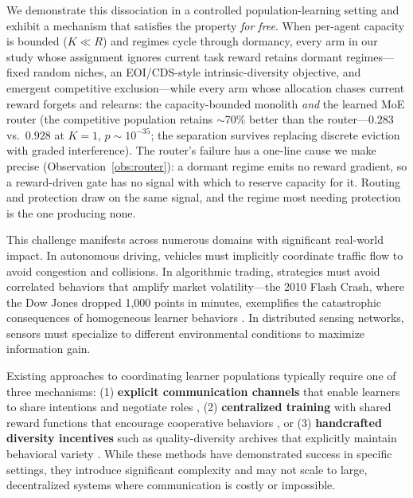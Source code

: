 \documentclass{article}
\begin{document}
We demonstrate this dissociation in a controlled population-learning setting and exhibit a mechanism that satisfies the property \emph{for free}. When per-agent capacity is bounded ($K \ll R$) and regimes cycle through dormancy, every arm in our study whose assignment ignores current task reward retains dormant regimes---fixed random niches, an EOI/CDS-style intrinsic-diversity objective, and emergent competitive exclusion---while every arm whose allocation chases current reward forgets and relearns: the capacity-bounded monolith \emph{and} the learned MoE router (the competitive population retains $\sim$70\% better than the router---$0.283$ vs.\ $0.928$ at $K{=}1$, $p\sim10^{-35}$; the separation survives replacing discrete eviction with graded interference). The router's failure has a one-line cause we make precise (Observation~\ref{obs:router}): a dormant regime emits no reward gradient, so a reward-driven gate has no signal with which to reserve capacity for it. Routing and protection draw on the same signal, and the regime most needing protection is the one producing none.

This challenge manifests across numerous domains with significant real-world impact. In autonomous driving, vehicles must implicitly coordinate traffic flow to avoid congestion and collisions. In algorithmic trading, strategies must avoid correlated behaviors that amplify market volatility---the 2010 Flash Crash, where the Dow Jones dropped 1,000 points in minutes, exemplifies the catastrophic consequences of homogeneous learner behaviors \cite{kirilenko2017flash}. In distributed sensing networks, sensors must specialize to different environmental conditions to maximize information gain.

Existing approaches to coordinating learner populations typically require one of three mechanisms: (1) \textbf{explicit communication channels} that enable learners to share intentions and negotiate roles \cite{foerster2016learning}, (2) \textbf{centralized training} with shared reward functions that encourage cooperative behaviors \cite{lowe2017multi}, or (3) \textbf{handcrafted diversity incentives} such as quality-diversity archives that explicitly maintain behavioral variety \cite{pugh2016quality, mouret2015illuminating}. While these methods have demonstrated success in specific settings, they introduce significant complexity and may not scale to large, decentralized systems where communication is costly or impossible.
\end{document}
